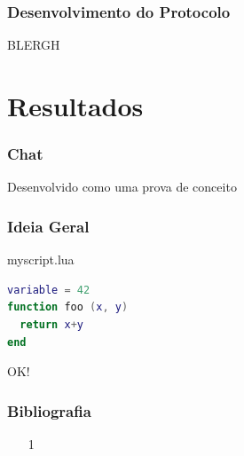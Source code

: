 \documentclass[brazil]{beamer}
\begin{document}
\begin{frame}
  \frametitle{Desenvolvimento do Protocolo}
  
  BLERGH
\end{frame}
\section{Resultados}
\begin{frame}
  \frametitle{Chat}
  
  Desenvolvido como uma prova de conceito
\end{frame}
\begin{frame}[fragile]
  \frametitle{Ideia Geral}
  \pause
  \begin{block}{myscript.lua}
    \begin{lstlisting}[language=lua]
variable = 42
function foo (x, y)
  return x+y
end
    \end{lstlisting}
  \end{block}
\end{frame}
\begin{frame}
  \begin{center}
    \LARGE OK!
  \end{center}
\end{frame}
\begin{frame}
  \frametitle{Bibliografia}
  \begin{itemize}
    \footnotesize
    \item[1]
    \vspace{1em}
  \end{itemize}
\end{frame}
\end{document}
